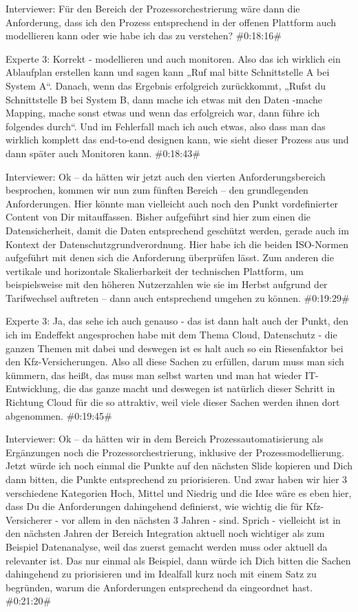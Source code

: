Interviewer:
Für den Bereich der Prozessorchestrierung wäre dann die Anforderung, dass ich den Prozess entsprechend in der offenen Plattform auch modellieren kann oder wie habe ich das zu verstehen?
\#0:18:16\#

Experte 3:
Korrekt - modellieren und auch monitoren. Also das ich wirklich ein Ablaufplan erstellen kann und sagen kann „Ruf mal bitte Schnittstelle A bei System A“. Danach, wenn das Ergebnis erfolgreich zurückkommt, „Rufst du Schnittstelle B bei System B, dann mache ich etwas mit den Daten -mache Mapping, mache sonst etwas und wenn das erfolgreich war, dann führe ich folgendes durch“. Und im Fehlerfall mach ich auch etwas, also dass man das wirklich komplett das end-to-end designen kann, wie sieht dieser Prozess aus und dann später auch Monitoren kann.
\#0:18:43\#

Interviewer:
Ok – da hätten wir jetzt auch den vierten Anforderungsbereich besprochen, kommen wir nun zum fünften Bereich – den grundlegenden Anforderungen. Hier könnte man vielleicht auch noch den Punkt vordefinierter Content von Dir mitauffassen. Bisher aufgeführt sind hier zum einen die Datensicherheit, damit die Daten entsprechend geschützt werden, gerade auch im Kontext der Datenschutzgrundverordnung. Hier habe ich die beiden ISO-Normen aufgeführt mit denen sich die Anforderung überprüfen lässt. Zum anderen die vertikale und horizontale Skalierbarkeit der technischen Plattform, um beispielsweise mit den höheren Nutzerzahlen wie sie im Herbst aufgrund der Tarifwechsel auftreten – dann auch entsprechend umgehen zu können.
\#0:19:29\#

Experte 3:
Ja, das sehe ich auch genauso - das ist dann halt auch der Punkt, den ich im Endeffekt angesprochen habe mit dem Thema Cloud, Datenschutz - die ganzen Themen mit dabei und deswegen ist es halt auch so ein Riesenfaktor bei den Kfz-Versicherungen. Also all diese Sachen zu erfüllen, darum muss man sich kümmern, das heißt, das muss man selbst warten und man hat wieder IT-Entwicklung, die das ganze macht und deswegen ist natürlich dieser Schritt in Richtung Cloud für die so attraktiv, weil viele dieser Sachen werden ihnen dort abgenommen.
\#0:19:45\#

Interviewer:
Ok – da hätten wir in dem Bereich Prozessautomatisierung als Ergänzungen noch die Prozessorchestrierung, inklusive der Prozessmodellierung. Jetzt würde ich noch einmal die Punkte auf den nächsten Slide kopieren und Dich dann bitten, die Punkte entsprechend zu priorisieren. Und zwar haben wir hier 3 verschiedene Kategorien Hoch, Mittel und Niedrig und die Idee wäre es eben hier, dass Du die Anforderungen dahingehend definierst, wie wichtig die für Kfz-Versicherer - vor allem in den nächsten 3 Jahren - sind. Sprich - vielleicht ist in den nächsten Jahren der Bereich Integration aktuell noch wichtiger als zum Beispiel Datenanalyse, weil das zuerst gemacht werden muss oder aktuell da relevanter ist. Das nur einmal als Beispiel, dann würde ich Dich bitten die Sachen dahingehend zu priorisieren und im Idealfall kurz noch mit einem Satz zu begründen, warum die Anforderungen entsprechend da eingeordnet hast.
\#0:21:20\#


